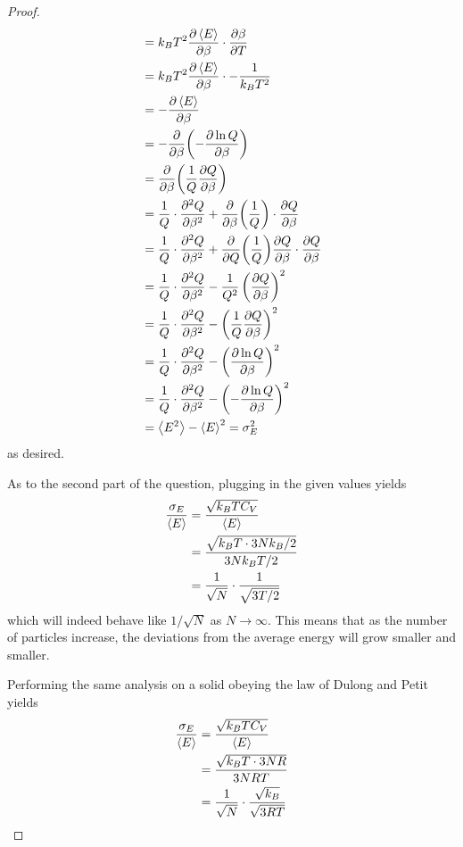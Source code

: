 \documentclass[../psets.tex]{subfiles}
\begin{document}
\begin{enumerate}
\begin{proof}
\begin{align*}
            &= k_BT^2\pdv{\left\langle{E}\right\rangle}{\beta}\cdot\pdv{\beta}{T}\\
            &= k_BT^2\pdv{\left\langle{E}\right\rangle}{\beta}\cdot-\frac{1}{k_BT^2}\\
            &= -\pdv{\left\langle{E}\right\rangle}{\beta}\\
            &= -\pdv{\beta}(-\pdv{\ln Q}{\beta})\\
            &= \pdv{\beta}(\frac{1}{Q}\pdv{Q}{\beta})\\
            &= \frac{1}{Q}\cdot\pdv[2]{Q}{\beta}+\pdv{\beta}(\frac{1}{Q})\cdot\pdv{Q}{\beta}\\
            &= \frac{1}{Q}\cdot\pdv[2]{Q}{\beta}+\pdv{Q}(\frac{1}{Q})\pdv{Q}{\beta}\cdot\pdv{Q}{\beta}\\
            &= \frac{1}{Q}\cdot\pdv[2]{Q}{\beta}-\frac{1}{Q^2}\left( \pdv{Q}{\beta} \right)^2\\
            &= \frac{1}{Q}\cdot\pdv[2]{Q}{\beta}-\left( \frac{1}{Q}\pdv{Q}{\beta} \right)^2\\
            &= \frac{1}{Q}\cdot\pdv[2]{Q}{\beta}-\left( \pdv{\ln Q}{\beta} \right)^2\\
            &= \frac{1}{Q}\cdot\pdv[2]{Q}{\beta}-\left( -\pdv{\ln Q}{\beta} \right)^2\\
            &= \left\langle{E^2}\right\rangle-\left\langle{E}\right\rangle^2 = \sigma_E^2
        \end{align*}
        as desired.\par
        As to the second part of the question, plugging in the given values yields
        \begin{align*}
            \frac{\sigma_E}{\left\langle{E}\right\rangle} &= \frac{\sqrt{k_BTC_V}}{\left\langle{E}\right\rangle}\\
            &= \frac{\sqrt{k_BT\cdot 3Nk_B/2}}{3Nk_BT/2}\\
            &= \frac{1}{\sqrt{N}}\cdot\frac{1}{\sqrt{3T/2}}
        \end{align*}
        which will indeed behave like $1/\sqrt{N}$ as $N\to\infty$. This means that as the number of particles increase, the deviations from the average energy will grow smaller and smaller.\par
        Performing the same analysis on a solid obeying the law of Dulong and Petit yields
        \begin{align*}
            \frac{\sigma_E}{\left\langle{E}\right\rangle} &= \frac{\sqrt{k_BTC_V}}{\left\langle{E}\right\rangle}\\
            &= \frac{\sqrt{k_BT\cdot 3NR}}{3NRT}\\
            &= \frac{1}{\sqrt{N}}\cdot\frac{\sqrt{k_B}}{\sqrt{3RT}}
        \end{align*}

\end{proof}
\end{enumerate}
\end{document}
